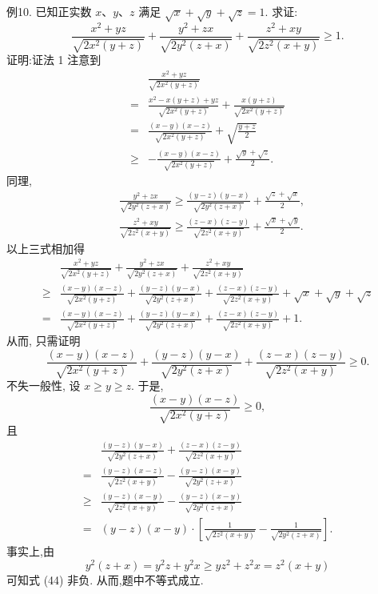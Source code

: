 例10. 已知正实数 $x 、 y 、 z$ 满足 $\sqrt{x}+\sqrt{y}+\sqrt{z}=1$. 求证:
$$
\frac{x^2+y z}{\sqrt{2 x^2(y+z)}}+\frac{y^2+z x}{\sqrt{2 y^2(z+x)}}+\frac{z^2+x y}{\sqrt{2 z^2(x+y)}} \geqslant 1 .
$$
证明:证法 1 注意到
$$
\begin{aligned}
& \frac{x^2+y z}{\sqrt{2 x^2(y+z)}} \\
= & \frac{x^2-x(y+z)+y z}{\sqrt{2 x^2(y+z)}}+\frac{x(y+z)}{\sqrt{2 x^2(y+z)}} \\
= & \frac{(x-y)(x-z)}{\sqrt{2 x^2(y+z)}}+\sqrt{\frac{y+z}{2}} \\
\geqslant & -\frac{(x-y)(x-z)}{\sqrt{2 x^2(y+z)}}+\frac{\sqrt{y}+\sqrt{z}}{2} .
\end{aligned}
$$
同理,
$$
\begin{aligned}
& \frac{y^2+z x}{\sqrt{2 y^2(z+x)}} \geqslant \frac{(y-z)(y-x)}{\sqrt{2 y^2(z+x)}}+\frac{\sqrt{z}+\sqrt{x}}{2}, \\
& \frac{z^2+x y}{\sqrt{2 z^2(x+y)}} \geqslant \frac{(z-x)(z-y)}{\sqrt{2 z^2(x+y)}}+\frac{\sqrt{x}+\sqrt{y}}{2} .
\end{aligned}
$$
以上三式相加得
$$
\begin{aligned}
& \frac{x^2+y z}{\sqrt{2 x^2(y+z)}}+\frac{y^2+z x}{\sqrt{2 y^2(z+x)}}+\frac{z^2+x y}{\sqrt{2 z^2(x+y)}} \\
\geqslant & \frac{(x-y)(x-z)}{\sqrt{2 x^2(y+z)}}+\frac{(y-z)(y-x)}{\sqrt{2 y^2(z+x)}}+\frac{(z-x)(z-y)}{\sqrt{2 z^2(x+y)}}+\sqrt{x}+\sqrt{y}+\sqrt{z} \\
= & \frac{(x-y)(x-z)}{\sqrt{2 x^2(y+z)}}+\frac{(y-z)(y-x)}{\sqrt{2 y^2(z+x)}}+\frac{(z-x)(z-y)}{\sqrt{2 z^2(x+y)}}+1 .
\end{aligned}
$$
从而, 只需证明
$$
\frac{(x-y)(x-z)}{\sqrt{2 x^2(y+z)}}+\frac{(y-z)(y-x)}{\sqrt{2 y^2(z+x)}}+\frac{(z-x)(z-y)}{\sqrt{2 z^2(x+y)}} \geqslant 0 .
$$
不失一般性, 设 $x \geqslant y \geqslant z$. 于是,
$$
\frac{(x-y)(x-z)}{\sqrt{2 x^2(y+z)}} \geqslant 0,
$$
且
$$
\begin{aligned}
& \frac{(y-z)(y-x)}{\sqrt{2 y^2(z+x)}}+\frac{(z-x)(z-y)}{\sqrt{2 z^2(x+y)}} \\
= & \frac{(y-z)(x-z)}{\sqrt{2 z^2(x+y)}}-\frac{(y-z)(x-y)}{\sqrt{2 y^2(z+x)}} \\
\geqslant & \frac{(y-z)(x-y)}{\sqrt{2 z^2(x+y)}}-\frac{(y-z)(x-y)}{\sqrt{2 y^2(z+x)}} \\
= & (y-z)(x-y) \cdot\left[\frac{1}{\sqrt{2 z^2(x+y)}}-\frac{1}{\sqrt{2 y^2(z+x)}}\right] . \label{(44)}
\end{aligned}
$$
事实上,由
$$
y^2(z+x)=y^2 z+y^2 x \geqslant y z^2+z^2 x=z^2(x+y)
$$
可知式 (44) 非负.
从而,题中不等式成立.



